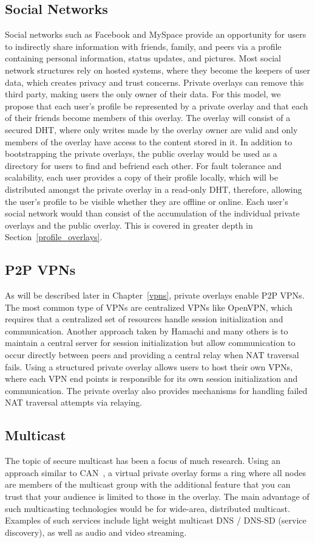 \subsection{Social Networks}
Social networks such as Facebook and MySpace provide an opportunity for users to
indirectly share information with friends, family, and peers via a profile
containing personal information, status updates, and pictures.
Most social network structures rely on hosted systems, where they become
the keepers of user data, which creates privacy and trust concerns.  Private overlays
can remove this third party, making users the only owner of their data.  For this
model, we propose that each user's profile be represented by a private overlay
and that each of their friends become members of this overlay.  The overlay will
consist of a secured DHT, where only writes made by the overlay owner are valid
and only members of the overlay have access to the content stored in it.  In
addition to bootstrapping the private overlays, the public overlay would be
used as a directory for users to find and befriend each other.  For fault
tolerance and scalability, each user provides a copy of their profile
locally, which will be distributed amongst the private overlay in a read-only
DHT, therefore, allowing the user's profile to be visible whether they are
offline or online.  Each user's social network would than consist of the
accumulation of the individual private overlays and the public overlay.
This is covered in greater depth in Section~\ref{profile_overlays}.

\subsection{P2P VPNs}
As will be described later in Chapter~\ref{vpns}, private overlays enable P2P
VPNs.  The most common type of VPNs are centralized VPNs like OpenVPN, which
requires that a centralized set of resources handle session initialization and
communication.  Another approach taken by Hamachi and many others is to
maintain a central server for session initialization but allow communication to
occur directly between peers and providing a central relay when NAT traversal
fails.  Using a structured private overlay allows users to host their own
VPNs, where each VPN end points is responsible for its own session
initialization and communication.  The private overlay also provides mechanisms
for handling failed NAT traversal attempts via relaying.

\subsection{Multicast}
The topic of secure multicast has been a focus of much research.  Using an
approach similar to CAN~\cite{can_multicast}, a virtual private overlay forms
a ring where all nodes are members of the multicast group with the additional
feature that you can trust that your audience is limited to those in the
overlay.  The main advantage of such multicasting technologies would be for
wide-area, distributed multicast.  Examples of such services include 
light weight multicast DNS / DNS-SD (service discovery), as well as
audio and video streaming.

